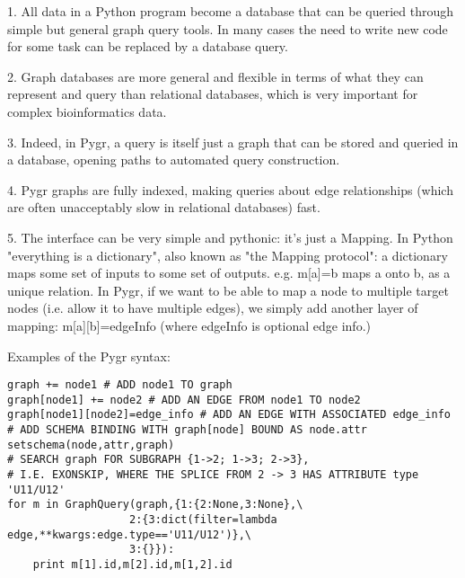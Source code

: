 \documentclass{howto}
\begin{document}
   1. All data in a Python program become a database  that can be queried through simple but general graph query tools.  In many cases the need to write new code for some task can be replaced by a database query. 

   2. Graph databases are more general and flexible in terms of what they can represent and query than relational databases, which is very important for complex bioinformatics data.

   3. Indeed, in Pygr, a query is itself just a graph that can be stored and queried in a database, opening paths to automated query construction.

   4. Pygr graphs are fully indexed, making queries about edge relationships (which are often unacceptably slow in relational databases) fast.

   5. The interface can be very simple and pythonic: it's just a Mapping.  In Python "everything is a dictionary", also known as "the Mapping protocol": a dictionary maps some set of inputs to some set of outputs. e.g. m[a]=b maps a onto b, as a unique relation.  In Pygr, if we want to be able to map a node to multiple target nodes (i.e. allow it to have multiple edges), we simply add another layer of mapping: m[a][b]=edgeInfo (where edgeInfo is optional edge info.)

Examples of the Pygr syntax:

\begin{verbatim}
graph += node1 # ADD node1 TO graph
graph[node1] += node2 # ADD AN EDGE FROM node1 TO node2
graph[node1][node2]=edge_info # ADD AN EDGE WITH ASSOCIATED edge_info
# ADD SCHEMA BINDING WITH graph[node] BOUND AS node.attr
setschema(node,attr,graph) 
# SEARCH graph FOR SUBGRAPH {1->2; 1->3; 2->3}, 
# I.E. EXONSKIP, WHERE THE SPLICE FROM 2 -> 3 HAS ATTRIBUTE type 'U11/U12' 
for m in GraphQuery(graph,{1:{2:None,3:None},\
                   2:{3:dict(filter=lambda edge,**kwargs:edge.type=='U11/U12')},\
                   3:{}}):
    print m[1].id,m[2].id,m[1,2].id
\end{verbatim}
\end{document}
